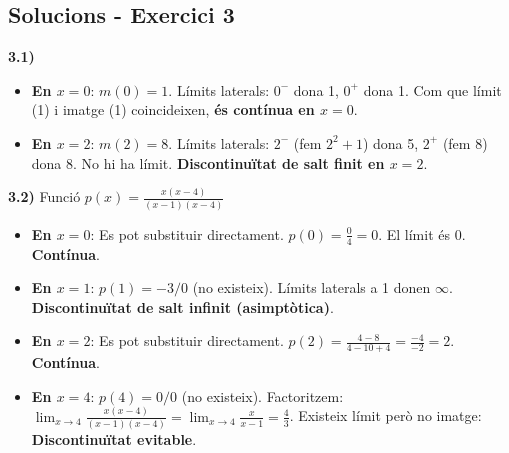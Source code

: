 \documentclass[12pt,a4paper]{article}
\begin{document}
\subsection*{Solucions - Exercici 3}
\textbf{3.1)} 
\begin{itemize}
    \item \textbf{En $x=0$}: $m(0) = 1$. Límits laterals: $0^-$ dona 1, $0^+$ dona 1. Com que límit (1) i imatge (1) coincideixen, \textbf{és contínua en $x=0$}.
    \item \textbf{En $x=2$}: $m(2) = 8$. Límits laterals: $2^-$ (fem $2^2+1$) dona 5, $2^+$ (fem 8) dona 8. No hi ha límit. \textbf{Discontinuïtat de salt finit en $x=2$}.
\end{itemize}

\textbf{3.2)} Funció $p(x) = \frac{x(x-4)}{(x-1)(x-4)}$
\begin{itemize}
    \item \textbf{En $x=0$}: Es pot substituir directament. $p(0) = \frac{0}{4} = 0$. El límit és 0. \textbf{Contínua}.
    \item \textbf{En $x=1$}: $p(1) = -3/0$ (no existeix). Límits laterals a 1 donen $\infty$. \textbf{Discontinuïtat de salt infinit (asimptòtica)}.
    \item \textbf{En $x=2$}: Es pot substituir directament. $p(2) = \frac{4-8}{4-10+4} = \frac{-4}{-2} = 2$. \textbf{Contínua}.
    \item \textbf{En $x=4$}: $p(4) = 0/0$ (no existeix). Factoritzem: $\lim_{x \to 4} \frac{x(x-4)}{(x-1)(x-4)} = \lim_{x \to 4} \frac{x}{x-1} = \frac{4}{3}$. Existeix límit però no imatge: \textbf{Discontinuïtat evitable}.
\end{itemize}
\end{document}
